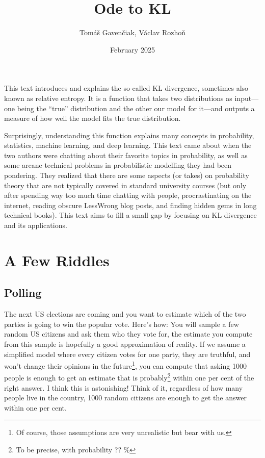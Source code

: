 \documentclass{article}
\title{Ode to KL}
\author{Tomáš Gavenčiak, Václav Rozhoň}
\date{February 2025}
\begin{document}
\maketitle


This text introduces and explains the so-called KL divergence, sometimes also known as relative entropy. It is a function that takes two distributions as input—one being the ``true'' distribution and the other our model for it—and outputs a measure of how well the model fits the true distribution.

Surprisingly, understanding this function explains many concepts in probability, statistics, machine learning, and deep learning. This text came about when the two authors were chatting about their favorite topics in probability, as well as some arcane technical problems in probabilistic modelling they had been pondering. They realized that there are some aspects (or takes) on probability theory that are not typically covered in standard university courses (but only after spending way too much time chatting with people, procrastinating on the internet, reading obscure LessWrong blog posts, and finding hidden gems in long technical books). This text aims to fill a small gap by focusing on KL divergence and its applications.

\section{A Few Riddles}

\subsection{Polling}

The next US elections are coming and you want to estimate which of the two parties is going to win the popular vote. Here's how: You will sample a few random US citizens and ask them who they vote for, the estimate you compute from this sample is hopefully a good approximation of reality. If we assume a simplified model where every citizen votes for one party, they are truthful, and won't change their opinions in the future\footnote{Of course, those assumptions are very unrealistic but bear with us. }, you can compute that asking 1000 people is enough to get an estimate that is probably\footnote{To be precise, with probability ?? \%} within one per cent of the right answer. I think this is astonishing! Think of it, regardless of how many people live in the country, 1000 random citizens are enough to get the answer within one per cent. 
\end{document}
